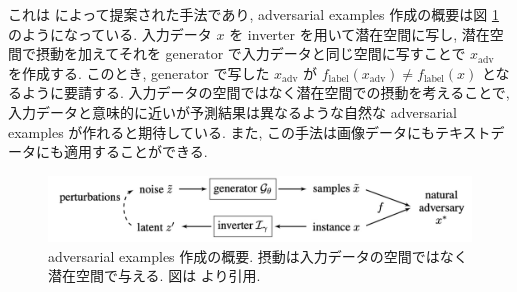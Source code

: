 これは \cite{zhao2017generating} によって提案された手法であり, adversarial examples 作成の概要は図 \ref{fig:generating-natural-summary} のようになっている.
入力データ $x$ を inverter を用いて潜在空間に写し, 潜在空間で摂動を加えてそれを generator で入力データと同じ空間に写すことで $x_{\text{adv}}$ を作成する.
このとき, generator で写した $x_{\text{adv}}$ が $f_{\text{label}} (x_{\text{adv}}) \neq f_{\text{label}} (x)$ となるように要請する.
入力データの空間ではなく潜在空間での摂動を考えることで, 入力データと意味的に近いが予測結果は異なるような自然な adversarial examples が作れると期待している.
また, この手法は画像データにもテキストデータにも適用することができる.
%
\begin{figure}[htbp]
\begin{center}
\includegraphics[width=14.0cm]{figures/generating-natural-summary.pdf}
\end{center}
\caption{
adversarial examples 作成の概要.
摂動は入力データの空間ではなく潜在空間で与える.
図は \cite{zhao2017generating} より引用.
}
\label{fig:generating-natural-summary}
\end{figure}
%

